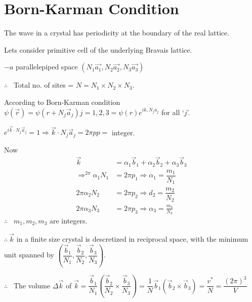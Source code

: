 \section*{Born-Karman Condition}

The wave in a crystal has periodicity at the boundary of the real lattice.

Lets consider primitive cell of the underlying Bravais lattice.

$-a$ parallelepiped space $(N_{1}\overrightarrow{a_{1}}, N_{2}\overrightarrow{a_{2}},N_{3}\overrightarrow{a_{3}})$

$\therefore$ \ Total no. of sites = $N=N_{1}\times N_{2}\times N_{3}$.

According to Born-Karman condition $\psi(\overrightarrow{r})=\psi(r+N_{j}\overrightarrow{a}_{j})j=1,2,3=\psi(r)e^{ik,N_{j}a_{j}}$ for all `$j$'.

$e^{i\overrightarrow{k}\cdot N_{j}\overrightarrow{a}_{j}}=1 \Rightarrow \overrightarrow{k}\cdot N_{j}\overrightarrow{a}_{j}=2\pi p$\quad $p=$ integer.

Now 
\begin{align*}
\overrightarrow{k} &= \alpha_{1}\overrightarrow{b}_{1}+\alpha_{2}\overrightarrow{b}_{2}+\alpha_{3}\overrightarrow{b}_{3}\\
\Rightarrow^{2\pi}\alpha_{1}N_{1} &=2\pi p_{1}\Rightarrow\alpha_{1}=\dfrac{m_{1}}{N_{1}}\\
2\pi \alpha_{2}N_{2} &= 2\pi p_{2}\Rightarrow d_{2}=\dfrac{m_{2}}{N_{2}}\\
2\pi\alpha_{3}N_{3} &= 2\pi p_{3}\Rightarrow \alpha_{3}=\frac{m_{3}}{N_{3}}
\end{align*}
$\therefore$ \ \quad $m_{1},m_{2},m_{3}$ are integers.

$\therefore \ \overrightarrow{k}$ in a finite size crystal is descretized in reciprocal space, with the minimum unit spanned by $\left(\dfrac{\overrightarrow{b}_{1}}{N_{1}},\dfrac{\overrightarrow{b}_{2}}{N_{2}},\dfrac{\overrightarrow{b}_{3}}{N_{3}}\right)$.

$\therefore$ \ The volume $\Delta \overrightarrow{k}$ of $\overrightarrow{k}=\dfrac{\overrightarrow{b}_{1}}{N_{1}}\left(\dfrac{\overrightarrow{b}_{2}}{N_{2}}\times \dfrac{\overrightarrow{b}_{3}}{N_{3}}\right)=\dfrac{1}{N}\overrightarrow{b}_{1}(\overrightarrow{b}_{2}\times \overrightarrow{b}_{3})=\dfrac{v^{*}}{N}=\dfrac{(2\pi)^{3}}{V}$

